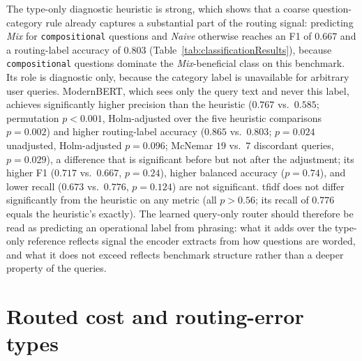 \documentclass[english, bibtex]{kththesis}               %
\numberwithin{listing}{chapter}
\begin{document}
The type-only diagnostic heuristic is strong, which shows that a coarse question-category rule already captures a substantial part of the routing signal: predicting \emph{Mix} for \texttt{compositional} questions and \emph{Naive} otherwise reaches an F1 of $0.667$ and a routing-label accuracy of $0.803$ (Table~\ref{tab:classificationResults}), because \texttt{compositional} questions dominate the \emph{Mix}-beneficial class on this benchmark. Its role is diagnostic only, because the category label is unavailable for arbitrary user queries. ModernBERT, which sees only the query text and never this label, achieves significantly higher precision than the heuristic ($0.767$ vs.\ $0.585$; permutation $p < 0.001$, Holm-adjusted over the five heuristic comparisons $p = 0.002$) and higher routing-label accuracy ($0.865$ vs.\ $0.803$; $p = 0.024$ unadjusted, Holm-adjusted $p = 0.096$; McNemar $19$ vs.\ $7$ discordant queries, $p = 0.029$), a difference that is significant before but not after the adjustment; its higher F1 ($0.717$ vs.\ $0.667$, $p = 0.24$), higher balanced accuracy ($p = 0.74$), and lower recall ($0.673$ vs.\ $0.776$, $p = 0.124$) are not significant. \gls{tfidf} does not differ significantly from the heuristic on any metric (all $p > 0.56$; its recall of $0.776$ equals the heuristic's exactly). The learned query-only router should therefore be read as predicting an operational label from phrasing: what it adds over the type-only reference reflects signal the encoder extracts from how questions are worded, and what it does not exceed reflects benchmark structure rather than a deeper property of the queries.

\section{Routed cost and routing-error types}
\label{sec:resultsCost}
\end{document}
